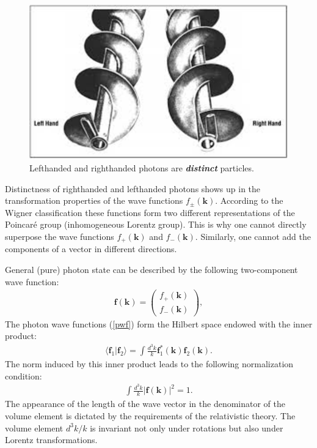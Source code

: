 \documentclass[twocolumn,aps,pra,10pt]{revtex4-1}
\begin{document}
\begin{figure}
\includegraphics[scale=0.95]{Fig2.eps}
\caption{Lefthanded and righthanded photons are {\bf\em distinct} particles.}
\end{figure}

Distinctness of righthanded and lefthanded photons shows up \cite{qm} in the transformation properties of the wave functions $f_\pm(\bm k)$. According to the Wigner classification \cite{wig} these functions form two different representations of the Poincar\'e group (inhomogeneous Lorentz group). This is why one cannot directly superpose the wave functions $f_+(\bm k)$ and $f_-(\bm k)$. Similarly, one cannot add the components of a vector in different directions.

General (pure) photon state can be described by the following two-component wave function:
\begin{align}\label{pwf}
{\mathfrak{\bm{f}}({\bm k})}=\left(\begin{array}{c}f_+({\bm k})\\f_-({\bm k})\end{array}\right),
\end{align}
The photon wave functions (\ref{pwf}) form the Hilbert space endowed with the inner product:
\begin{align}\label{spr}
\langle{\mathfrak{\bm{f}}_1}|{\mathfrak{\bm{f}}_2}\rangle
=\int\!\frac{d^3k}{k}{\mathfrak{\bm{f}}_1^*({\bm k})}{\mathfrak{\bm{f}}_2({\bm k})}.
\end{align}
The norm induced by this inner product leads to the following normalization condition:
\begin{align}\label{norm}
\int\!\frac{d^3k}{k}|{\mathfrak{\bm{f}}({\bm k})}|^2=1.
\end{align}
The appearance of the length of the wave vector in the denominator of the volume element is dictated by the requirements of the relativistic theory. The volume element $d^3k/k$ is invariant not only under rotations but also under Lorentz transformations.
\end{document}
